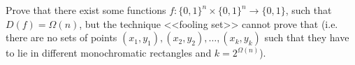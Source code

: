 Prove that there exist some functions $f\colon \{0, 1\}^n \times \{0, 1\}^n \to \{0, 1\}$, such that
$D(f) = \Omega(n)$, but the technique <<fooling set>> cannot prove that (i.e. there are no sets of points
$(x_1, y_1), (x_2, y_2), \dots, (x_k, y_k)$ such that they have to lie in different monochromatic
rectangles and $k = 2^{\Omega(n)}$).
